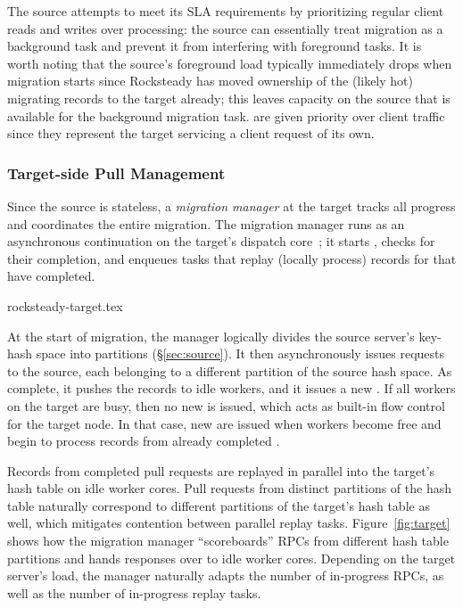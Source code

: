 The source attempts to meet its SLA requirements by prioritizing regular client
reads and writes over \pull processing: the source can essentially treat
migration as a background task and prevent it from interfering with foreground
tasks. It is worth noting that the source's foreground load typically
immediately drops when migration starts since Rocksteady has moved
ownership of the (likely hot) migrating records to the target already; this
leaves capacity on the source that is available for the background migration
task. \priopulls are given priority over client traffic since they
represent the target servicing a client request of its own.


\subsubsection{Target-side Pull Management}

Since the source is stateless, a {\em migration manager} at the target tracks
all progress and coordinates the entire migration.  The migration manager runs
as an asynchronous continuation on the target's dispatch
core~\cite{stutsman:dcft}; it starts \pulls, checks for their
completion, and enqueues tasks that replay (locally process) records for \pulls
that have completed.

 {rocksteady-target.tex}

At the start of migration, the manager logically divides the source
server's key-hash
space into partitions (\S\ref{sec:source}). It then asynchronously issues
\pull requests to the source, each belonging to a different partition of the
source hash space. As \pulls complete, it pushes the records to idle workers,
and it issues a new \pull. If all workers on the target are busy, then
no new \pull is issued, which acts as built-in flow control
for the target node. In that case, new \pulls are issued when workers become
free and begin to process records from already completed \pulls.

Records from completed pull requests are replayed in parallel into the
target's hash table on idle worker cores.  Pull requests from distinct
partitions of the hash table naturally correspond to different partitions of
the target's hash table as well, which mitigates contention between parallel
replay tasks.
Figure~\ref{fig:target} shows how the
migration manager ``scoreboards'' \pull RPCs from different hash table partitions and
hands responses over to idle worker cores.
Depending on the target server's load, the manager naturally
adapts the number of in-progress \pull RPCs, as well as the number of
in-progress replay tasks.

